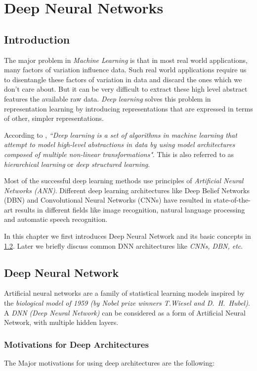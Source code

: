 \chapter{Deep Neural Networks}
\label{chap:dnn}
\section{Introduction}
The major problem in \textit{Machine Learning} is that in most real world applications, many factors of variation influence data.  Such real world applications require us to disentangle these factors of variation in data and discard the ones which we don't care about.  But it can be very difficult to extract these high level abstract features the available raw data.  \textit{Deep learning} solves this problem in representation learning by introducing representations that are expressed in terms of other, simpler representations.

According to \citet{deng2014deep}, \textit{``Deep learning is a set of algorithms in machine learning that attempt to model high-level abstractions in data by using model architectures composed of multiple non-linear transformations"}.  This is also referred to as \textit{hierarchical learning} or \textit{deep structured learning}. 

Most of the successful deep learning methods use principles of \textit{Artificial Neural Networks (ANN)}.  Different deep learning architectures like Deep Belief Networks (DBN) and Convolutional Neural Networks (CNNs) have resulted in state-of-the-art results in different fields like image recognition, natural language processing and automatic speech recognition.

In this chapter we first introduces Deep Neural Network and its basic concepts in \ref{sec:dnn:dnn}.  Later we briefly discuss common DNN architectures like \textit{CNNs, DBN, etc}.

\section{Deep Neural Network}
\label{sec:dnn:dnn}
Artificial neural networks are a family of statistical learning models inspired by the \textit{biological model of 1959 (by Nobel prize winners T.Wiesel and D.~H.~Hubel)}.  A \textit{DNN (Deep Neural Network)} can be considered as a form of Artificial Neural Network, with multiple hidden layers. 


\subsection{Motivations for Deep Architectures}
The Major motivations for using deep architectures are the following:

